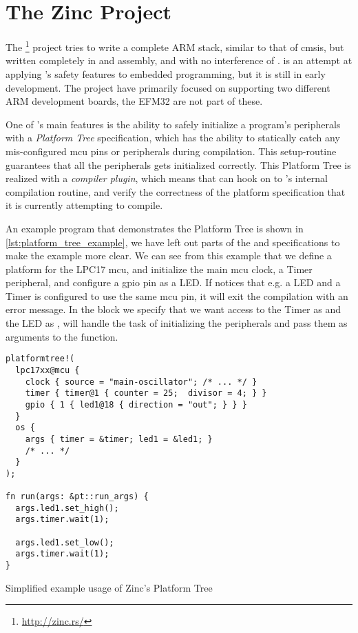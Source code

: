 
\section{The Zinc Project} %
\label{sec:zinc}

The {\zinc} \footnote{\url{http://zinc.rs/}} project tries to write a complete ARM stack, similar to that of \gls{cmsis}, but written completely in {\rust} and assembly, and with no interference of {\C}.
{\zinc} is an attempt at applying {\rust}'s safety features to embedded programming, but it is still in early development.
The project have primarily focused on supporting two different ARM development boards, the EFM32 are not part of these.

One of {\zinc}'s main features is the ability to safely initialize a program's peripherals with a \emph{Platform Tree} specification, which has the ability to statically catch any mis-configured \gls{mcu} pins or peripherals during compilation.
This setup-routine guarantees that all the peripherals gets initialized correctly.
This Platform Tree is realized with a {\rust} \emph{compiler plugin}, which means that {\zinc} can hook on to {\rustc}'s internal compilation routine, and verify the correctness of the platform specification that it is currently attempting to compile.

An example program that demonstrates the Platform Tree is shown in \autoref{lst:platform_tree_example}, we have left out parts of the  and  specifications to make the example more clear.
We can see from this example that we define a platform for the LPC17 \gls{mcu}, and initialize the main \gls{mcu} clock, a Timer peripheral, and configure a \gls{gpio} pin as a LED.
If {\zinc} notices that e.g. a LED and a Timer is configured to use the same \gls{mcu} pin, it will exit the compilation with an error message.
In the  block we specify that we want access to the Timer as  and the LED as , {\zinc} will handle the task of initializing the peripherals and pass them as arguments to the  function.

\begin{listing}[H]
  \begin{verbatim}
platformtree!(
  lpc17xx@mcu {
    clock { source = "main-oscillator"; /* ... */ }
    timer { timer@1 { counter = 25;  divisor = 4; } }
    gpio { 1 { led1@18 { direction = "out"; } } }
  }
  os {
    args { timer = &timer; led1 = &led1; }
    /* ... */
  }
);

fn run(args: &pt::run_args) {
  args.led1.set_high();
  args.timer.wait(1);

  args.led1.set_low();
  args.timer.wait(1);
}
  \end{verbatim}
  \caption{Simplified example usage of Zinc's Platform Tree}
  \label{lst:platform_tree_example}
\end{listing}

